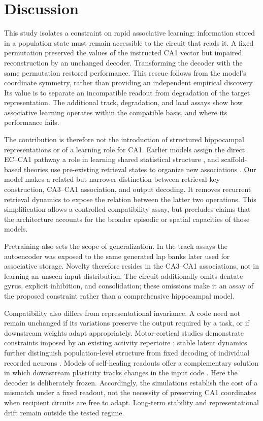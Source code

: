 \section{Discussion}

This study isolates a constraint on rapid associative learning: information
stored in a population state must remain accessible to the circuit that reads
it. A fixed permutation preserved the values of the instructed CA1 vector
but impaired reconstruction by an unchanged decoder. Transforming the decoder
with the same permutation restored performance. This rescue follows from the
model's coordinate symmetry, rather than providing an independent empirical
discovery. Its value is to separate an incompatible readout from degradation
of the target representation. The additional track, degradation, and load
assays show how associative learning operates within the compatible basis,
and where its performance fails.

The contribution is therefore not the introduction of structured hippocampal
representations or of a learning role for CA1. Earlier models assign the
direct EC--CA1 pathway a role in learning shared statistical structure
\citep{schapiro2017}, and scaffold-based theories use pre-existing retrieval
states to organize new associations \citep{chandra2025}. Our model makes a
related but narrower distinction between retrieval-key construction,
CA3--CA1 association, and output decoding. It removes recurrent retrieval
dynamics to expose the relation between the latter two operations. This
simplification allows a controlled compatibility assay, but precludes
claims that the architecture accounts for the broader episodic or spatial
capacities of those models.

Pretraining also sets the scope of generalization. In the track assays the
autoencoder was exposed to the same generated lap banks later used for
associative storage. Novelty therefore resides in the CA3--CA1 associations,
not in learning an unseen input distribution. The circuit additionally omits
dentate gyrus, explicit inhibition, and consolidation; these omissions make it
an assay of the proposed constraint rather than a comprehensive hippocampal
model.

Compatibility also differs from representational invariance. A code need
not remain unchanged if its variations preserve the output required by a
task, or if downstream weights adapt appropriately. Motor-cortical studies
demonstrate constraints imposed by an existing activity repertoire
\citep{sadtler2014,golub2018}; stable latent dynamics further distinguish
population-level structure from fixed decoding of individual recorded
neurons \citep{gallego2020}. Models of self-healing readouts offer a
complementary solution in which downstream plasticity tracks changes in the
input code \citep{rule2022}. Here the decoder is deliberately frozen.
Accordingly, the simulations establish the cost of a mismatch under a fixed
readout, not the necessity of preserving CA1 coordinates when recipient
circuits are free to adapt. Long-term stability and representational drift
remain outside the tested regime.

